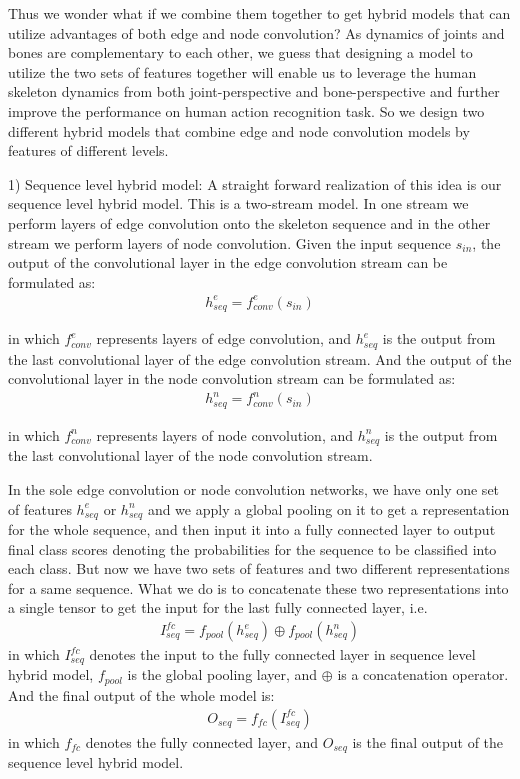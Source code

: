 \documentclass[a4paper,11pt]{article}
\begin{document}
Thus we wonder what if we combine them together to get hybrid models that can utilize advantages of both edge and node convolution? As dynamics of joints and bones are complementary to each other, we guess that designing a model to utilize the two sets of features together will enable us to leverage the human skeleton dynamics from both joint-perspective and bone-perspective and further improve the performance on human action recognition task. 
So we design two different hybrid models that combine edge and node convolution models by features of different levels.


1) Sequence level hybrid model: 
A straight forward realization of this idea is our sequence level hybrid model. This is a two-stream model. In one stream we perform layers of edge convolution onto the skeleton sequence and in the other stream we perform layers of node convolution. Given the input sequence $s_{in}$, the output of the convolutional layer in the edge convolution stream can be formulated as:
\begin{align}
& h_{seq}^e = f_{conv}^e (s_{in})&
\end{align}

in which $f_{conv}^e$ represents layers of edge convolution, and $h_{seq}^e$ is the output from the last convolutional layer of the edge convolution stream. And the output of the convolutional layer in the node convolution stream can be formulated as:
\begin{align}
& h_{seq}^n = f_{conv}^n (s_{in})&
\end{align}

in which $f_{conv}^n$ represents layers of node convolution, and $h_{seq}^n$ is the output from the last convolutional layer of the node convolution stream.

In the sole edge convolution or node convolution networks, we have only one set of features $h_{seq}^e$ or $h_{seq}^n$ and we apply a global pooling on it to get a representation for the whole sequence, and then input it into a fully connected layer 
 to output final class scores denoting the probabilities for the sequence to be classified into each class. But now we have two sets of features and two different representations for a same sequence. What we do is to concatenate these two representations into a single tensor to get the input for the last fully connected layer, i.e.
\begin{align}
& I_{seq}^{fc} = f_{pool}(h_{seq}^e) \oplus f_{pool}(h_{seq}^n)&
\end{align}
in which $I_{seq}^{fc}$ denotes the input to the fully connected layer in sequence level hybrid model, $f_{pool}$ is the global pooling layer, and $\oplus$ is a concatenation operator.
And the final output of the whole model is:
\begin{align}
& O_{seq} = f_{fc}(I_{seq}^{fc})&
\end{align}
in which $f_{fc}$ denotes the fully connected layer, and $O_{seq}$ is the final output of the sequence level hybrid model.
\end{document}
